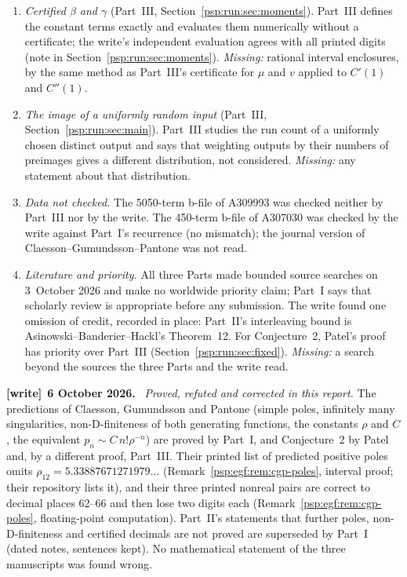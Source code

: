 \documentclass[11pt,letterpaper]{article}
\numberwithin{equation}{section}
\theoremstyle{remark}\newtheorem{remark}[theorem]{Remark}
\newenvironment{writenote}[1][]{\par\smallskip\begingroup\small
 \noindent\textbf{[write]}\if\relax\detokenize{#1}\relax\else~\textbf{#1.}\fi\ }%
 {\par\endgroup\smallskip}
\begin{document}
\begin{enumerate}
\item\label{psp:q:betagamma} \emph{Certified $\beta$ and $\gamma$} (Part~III, Section~\ref{psp:run:sec:moments}). Part~III defines the constant terms exactly and evaluates them numerically without a certificate; the write's independent evaluation agrees with all printed digits (note in Section~\ref{psp:run:sec:moments}). \emph{Missing:} rational interval enclosures, by the same method as Part~III's certificate for $\mu$ and $v$ applied to $C'(1)$ and $C''(1)$.
\item\label{psp:q:preimage} \emph{The image of a uniformly random input} (Part~III, Section~\ref{psp:run:sec:main}). Part~III studies the run count of a uniformly chosen distinct output and says that weighting outputs by their numbers of preimages gives a different distribution, not considered. \emph{Missing:} any statement about that distribution.
\item\label{psp:q:data} \emph{Data not checked.} The 5050-term b-file of A309993 was checked neither by Part~III nor by the write. The 450-term b-file of A307030 was checked by the write against Part~I's recurrence (no mismatch); the journal version of Claesson--Gu\dh mundsson--Pantone was not read.
\item\label{psp:q:literature} \emph{Literature and priority.} All three Parts made bounded source searches on 3~October 2026 and make no worldwide priority claim; Part~I says that scholarly review is appropriate before any submission. The write found one omission of credit, recorded in place: Part~II's interleaving bound is Asinowski--Banderier--Hackl's Theorem~12. For Conjecture~2, Patel's proof has priority over Part~III (Section~\ref{psp:run:sec:fixed}). \emph{Missing:} a search beyond the sources the three Parts and the write read.
\end{enumerate}
\begin{writenote}[6 October 2026]
\emph{Proved, refuted and corrected in this report.} The predictions of Claesson, Gu\dh mundsson and Pantone (simple poles, infinitely many singularities, non-D-finiteness of both generating functions, the constants $\rho$ and $C$, the equivalent $p_n\sim C\,n!\rho^{-n}$) are proved by Part~I, and Conjecture~2 by Patel and, by a different proof, Part~III. Their printed list of predicted positive poles omits $\rho_{12}=5.33887671271979\ldots$ (Remark~\ref{psp:egf:rem:cgp-poles}, interval proof; their repository lists it), and their three printed nonreal pairs are correct to decimal places 62--66 and then lose two digits each (Remark~\ref{psp:egf:rem:cgp-poles}, floating-point computation). Part~II's statements that further poles, non-D-finiteness and certified decimals are not proved are superseded by Part~I (dated notes, sentences kept). No mathematical statement of the three manuscripts was found wrong.
\end{writenote}
\end{document}
